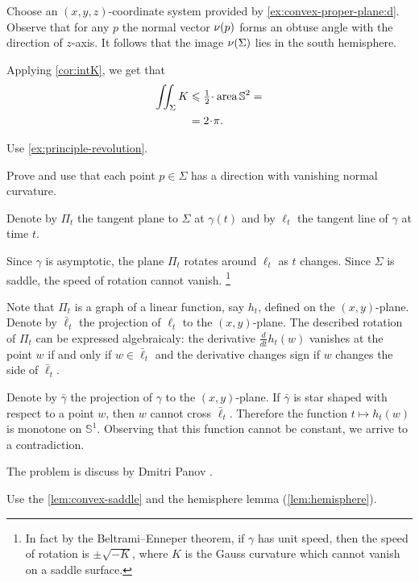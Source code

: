  Choose an $(x,y,z)$-coordinate system provided by \ref{ex:convex-proper-plane:d}.
Observe that for any $p$ the normal vector $\nu(p)$ forms an obtuse angle with the direction of $z$-axis.
It follows that the image $\nu(\Sigma)$ lies in the south hemisphere.

Applying \ref{cor:intK}, we get that 
\begin{align*}
\iint_\Sigma K&\le \tfrac12\cdot\area\mathbb{S}^2=
\\
&=2\cdot\pi.
\end{align*}

 Use \ref{ex:principle-revolution}.

 Prove and use that each point $p\in\Sigma$ has a direction with vanishing normal curvature.


 Denote by $\Pi_t$ the tangent plane to $\Sigma$ at $\gamma(t)$ and by $\ell_t$ the tangent line of $\gamma$ at time $t$.

Since $\gamma$ is asymptotic, the plane $\Pi_t$ rotates around $\ell_t$ as $t$ changes.
Since $\Sigma$ is saddle, the speed of rotation cannot vanish.%
\footnote{In fact by the Beltrami--Enneper theorem, if $\gamma$ has unit speed, then the speed of rotation is $\pm\sqrt{-K}$, where $K$ is the Gauss curvature which cannot vanish on a saddle surface.}

Note that $\Pi_t$ is a graph of a linear function, say $h_t$, defined on the $(x, y)$-plane.
Denote by $\bar\ell_t$ the projection of $\ell_t$ to the $(x, y)$-plane.
The described rotation of $\Pi_t$ can be expressed algebraicaly:
the derivative $\tfrac{d}{dt}h_t(w)$ vanishes at the point $w$ if and only if $w\in \bar\ell_t$ 
and the derivative changes sign if $w$ changes the side of $\bar\ell_t$.

Denote by $\bar\gamma$ the projection of $\gamma$ to the $(x, y)$-plane.
If $\bar\gamma$ is star shaped with respect to a point $w$, then $w$ cannot cross $\bar\ell_t$.
Therefore the function $t\mapsto h_t(w)$ is monotone on $\mathbb{S}^1$.
Observing that this function cannot be constant, we arrive to a contradiction.

 The problem is discuss by Dmitri Panov \cite{panov-curves}.

 Use the \ref{lem:convex-saddle} and the hemisphere lemma (\ref{lem:hemisphere}).

